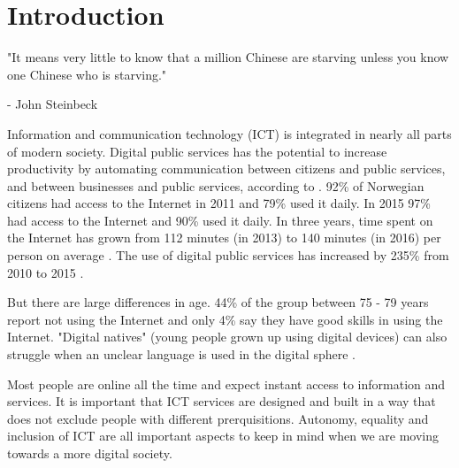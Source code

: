 \chapter{Introduction}

\begin{displayquote}
"It means very little to know that a million Chinese are starving unless you know one Chinese who is starving."

- John Steinbeck
\end{displayquote}

Information and communication technology (ICT) is integrated in nearly all parts of modern society. Digital public services has the potential to increase productivity by automating communication between citizens and public services, and between businesses and public services, according to \textcite{Moderniseringsdepartementet2016}. 92\% of Norwegian citizens had access to the Internet in 2011 and 79\% used it daily. In 2015 97\% had access to the Internet and 90\% used it daily. In three years, time spent on the Internet has grown from 112 minutes (in 2013) to 140 minutes (in 2016) per person on average \parencite{ssb_tid_2017}. The use of digital public services has increased by 235\% from 2010 to 2015 \parencite{Moderniseringsdepartementet2016}. 

But there are large differences in age. 44\% of the group between 75 - 79 years report not using the Internet and only 4\% say they have good skills in using the Internet. "Digital natives" (young people grown up using digital devices) can also struggle when an unclear language is used in the digital sphere \parencite[40]{Moderniseringsdepartementet2016}.

Most people are online all the time and expect instant access to information and services. It is important that ICT services are designed and built in a way that does not exclude people with different prerquisitions. Autonomy, equality and inclusion of ICT are all important aspects to keep in mind when we are moving towards a more digital society.

